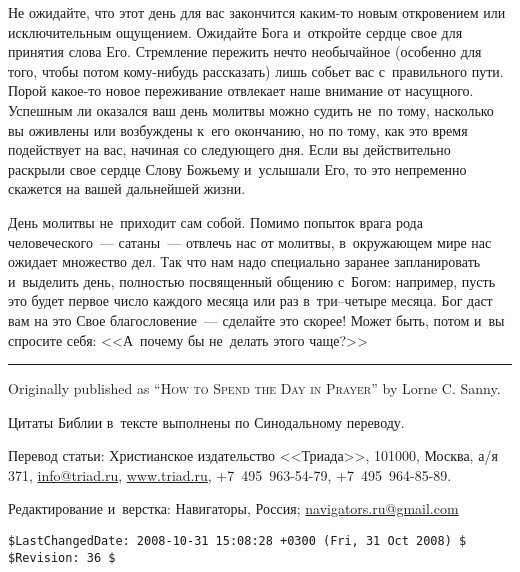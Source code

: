 \documentclass[12pt,article,a4paper,fittopage]{ncc}
\begin{document}
\begin{multicols}{2}
Не ожидайте, что этот день для вас закончится каким-то новым откровением или исключительным ощущением. Ожидайте Бога и~откройте сердце свое для принятия слова Его. Стремление пережить нечто необычайное (особенно для того, чтобы потом кому-нибудь рассказать) лишь собьет вас с~правильного пути. Порой какое-то новое переживание отвлекает наше внимание от насущного. Успешным ли оказался ваш день молитвы можно судить не~по тому, насколько вы оживлены или возбуждены к~его окончанию, но по тому, как это время подействует на вас, начиная со следующего дня. Если вы действительно раскрыли свое сердце Слову Божьему и~услышали Его, то это непременно скажется на вашей дальнейшей жизни.

День молитвы не~приходит сам собой. Помимо попыток врага рода человеческого~--- сатаны~--- отвлечь нас от молитвы, в~окружающем мире нас ожидает множество дел. Так что нам надо специально заранее запланировать и~выделить день, полностью посвященный общению с~Богом: например, пусть это будет первое число каждого месяца или раз в~три--четыре месяца. Бог даст вам на это Свое благословение~--- сделайте это скорее! Может быть, потом и~вы спросите себя: <<А~почему бы не~делать этого чаще?>>
\end{multicols}

\thispagestyle{lheadings} 

\vspace{0.5cm}
\hrule
\vspace{0.3cm}
\begin{footnotesize}

\noindent
Originally published as \textsc{``How to Spend the Day in Prayer''} by Lorne C. Sanny.

\vspace{0.2cm}
\noindent
Цитаты Библии в~тексте выполнены по Синодальному переводу.

\vspace{0.2cm}
\noindent
Перевод статьи: Христианское издательство <<Триада>>, 101000, Москва, а/я 371, \url{info@triad.ru}, 
\linebreak \url{www.triad.ru},  +7~495~963-54-79, +7~495~964-85-89.

\vspace{0.2cm}
\noindent
Редактирование и~верстка: Навигаторы, Россия; \url{navigators.ru@gmail.com}
\end{footnotesize}

{\tiny 
\begin{verbatim}
$LastChangedDate: 2008-10-31 15:08:28 +0300 (Fri, 31 Oct 2008) $
$Revision: 36 $
\end{verbatim}
}
\end{document}
